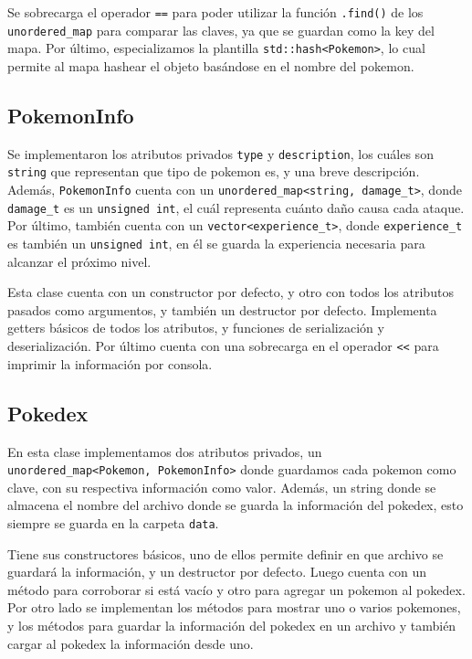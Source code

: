 \documentclass[11pt, a4paper]{article}
\begin{document}
\begin{multicols}{2}
Se sobrecarga el operador \lstinline|==| para poder utilizar la función \lstinline|.find()| de los \lstinline|unordered_map| para comparar las claves, ya que se guardan como la key del mapa. Por último, especializamos la plantilla \lstinline|std::hash<Pokemon>|, lo cual permite al mapa hashear el objeto basándose en el nombre del pokemon.

\subsection{PokemonInfo}


Se implementaron los atributos privados \lstinline|type| y \lstinline|description|, los cuáles son \lstinline|string| que representan que tipo de pokemon es, y una breve descripción. Además, \lstinline|PokemonInfo| cuenta con un \lstinline|unordered_map<string, damage_t>|, donde \lstinline|damage_t| es un \lstinline|unsigned int|, el cuál representa cuánto daño causa cada ataque. Por último, también cuenta con un \lstinline|vector<experience_t>|, donde \lstinline|experience_t| es también un \lstinline|unsigned int|, en él se guarda la experiencia necesaria para alcanzar el próximo nivel.

Esta clase cuenta con un constructor por defecto, y otro con todos los atributos pasados como argumentos, y también un destructor por defecto. Implementa getters básicos de todos los atributos, y funciones de serialización y deserialización. Por último cuenta con una sobrecarga en el operador \lstinline|<<| para imprimir la información por consola.

\subsection{Pokedex}

En esta clase implementamos dos atributos privados, un \lstinline|unordered_map<Pokemon, PokemonInfo>| donde guardamos cada pokemon como clave, con su respectiva información como valor. Además, un string donde se almacena el nombre del archivo donde se guarda la información del pokedex, esto siempre se guarda en la carpeta \lstinline|data|.

Tiene sus constructores básicos, uno de ellos permite definir en que archivo se guardará la información, y un destructor por defecto. Luego cuenta con un método para corroborar si está vacío y otro para agregar un pokemon al pokedex. Por otro lado se implementan los métodos para mostrar uno o varios pokemones, y los métodos para guardar la información del pokedex en un archivo y también cargar al pokedex la información desde uno.


\end{multicols}
\end{document}
